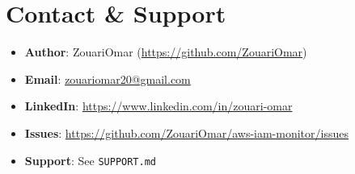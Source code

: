 \documentclass[11pt,a4paper]{report}
\begin{document}
\section*{Contact \& Support}

\begin{itemize}[leftmargin=1.4em]
  \item \textbf{Author}: ZouariOmar (\url{https://github.com/ZouariOmar})
  \item \textbf{Email}: \url{zouariomar20@gmail.com}
  \item \textbf{LinkedIn}: \url{https://www.linkedin.com/in/zouari-omar}
  \item \textbf{Issues}: \url{https://github.com/ZouariOmar/aws-iam-monitor/issues}
  \item \textbf{Support}: See \texttt{SUPPORT.md}
\end{itemize}
\end{document}
